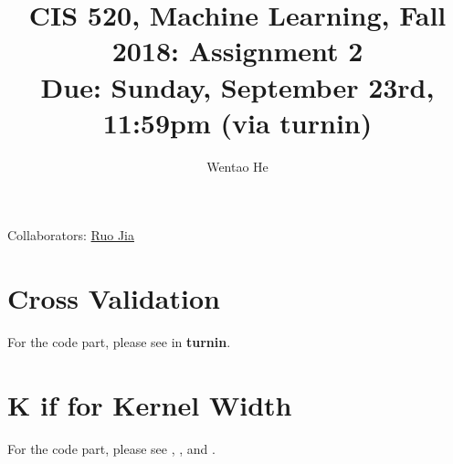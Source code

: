 \documentclass[english]{article}
\title{CIS 520, Machine Learning, Fall 2018: Assignment 2\\
Due: Sunday, September 23rd, 11:59pm (via turnin)}
\author{Wentao He}
\begin{document}
\maketitle

{\normalsize \noindent Collaborators: \underline{Ruo Jia}} \\

\section{Cross Validation}

For the code part, please see  in \textbf{turnin}.\\

\section{K if for Kernel Width}

For the code part, please see , ,  and .\\
\end{document}
